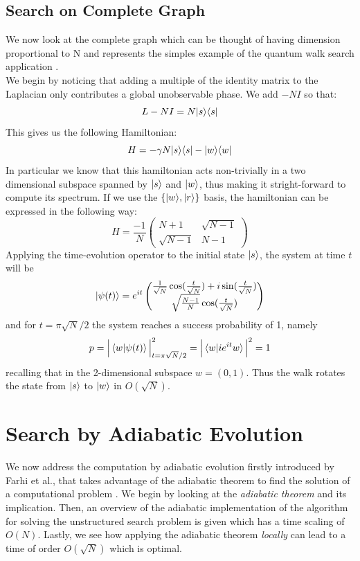 \subsection{Search on Complete Graph}\label{subsec:search qw complete graph}
We now look at the complete graph which can be thought of having dimension proportional to N and represents the simples example of the quantum walk search application \cite{Childs2004}. \\We begin by noticing that adding a multiple of the identity matrix to the Laplacian only contributes a global unobservable phase. We add $-NI$ so that:
\begin{equation}
  L - NI = N{|{s}\rangle}{\langle{s}|}
\end{equation}
This gives us the following Hamiltonian:
\begin{equation}
  H = -\gamma N {|{s}\rangle}{\langle{s}|} - {|{w}\rangle}{\langle{w}|}
\end{equation}
In particular we know that this hamiltonian acts non-trivially in a two dimensional subspace spanned by ${|{s}\rangle}$ and ${|{w}\rangle}$, thus making it stright-forward to compute its spectrum. If we use the $\{{|{w}\rangle}, {|{r}\rangle}\}$ basis, the hamiltonian can be expressed in the following way:
\begin{equation}
  H = \frac{-1}{N} \begin{pmatrix} N+1 & \sqrt{N-1}\\ \sqrt{N-1} & N-1 \end{pmatrix}
\end{equation}
Applying the time-evolution operator to the initial state ${|{s}\rangle}$, the system at time $t$ will be
\begin{equation}
  {|{\psi(t)}\rangle} = e^{it}
  \begin{pmatrix}
  \frac{1}{\sqrt{N}}\cos(\frac{t}{\sqrt{N}}) +i\sin(\frac{t}{\sqrt{N}})\\
  \sqrt{\frac{N-1}{N}}\cos(\frac{t}{\sqrt{N}})
  \end{pmatrix}
  \label{eq:qw_state}
\end{equation}
and for $t=\pi\sqrt{N}/2$ the system reaches a success probability of 1, namely
\begin{equation}
  p = \Big|\braket{w|\psi(t)}\Big|^2_{t=\pi\sqrt{N}/2} = \Big|\braket{w |  ie^{it}w}\Big|^2 = 1
\end{equation}
recalling that in the 2-dimensional subspace $w = (0,1)$. Thus the walk rotates the state from ${|{s}\rangle}$ to ${|{w}\rangle}$ in $O(\sqrt{N})$.

\section{Search by Adiabatic Evolution}\label{sec:adiabatic evolution}
We now address the computation by adiabatic evolution firstly introduced by Farhi et al., that takes advantage of the adiabatic theorem to find the solution of a computational problem \cite{Farhi2000}. We begin by looking at the \textit{adiabatic theorem} and its implication. Then, an overview of the adiabatic implementation of the algorithm for solving the unstructured search problem is given which has a time scaling of $O(N)$. Lastly, we see how applying the adiabatic theorem \textit{locally} can lead to a time of order $O(\sqrt{N})$ which is optimal.

